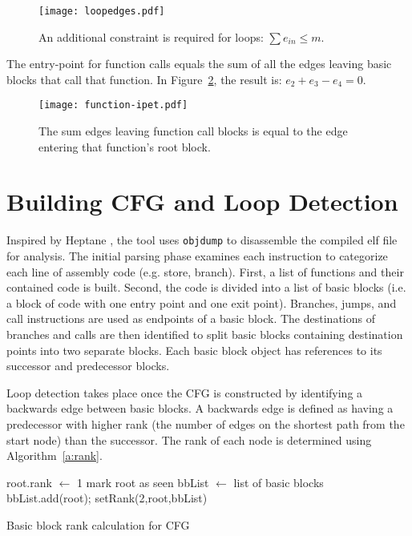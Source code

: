 \begin{figure}[h]
\centering
\texttt{[image: loopedges.pdf]}
\caption[Loop constraints in IPET]{An additional constraint is required for loops: $\sum e_{in} \leq m$.} 
\label{f:loopedges}
\end{figure}


The entry-point for function calls equals the sum of all the edges leaving basic blocks that call that function. In Figure~\ref{f:function-ipet}, the result is: $e_2+e_3-e_4 = 0$. 

\begin{figure}[h]
\centering
\texttt{[image: function-ipet.pdf]}
\caption{The sum edges leaving function call blocks is equal to the edge entering that function's root block.} 
\label{f:function-ipet}
\end{figure}
 

\section{Building CFG and Loop Detection}
\label{s:cfg}
	Inspired by Heptane \cite{heptane}, the tool uses \texttt{objdump} to disassemble the compiled elf file for analysis. 
	The initial parsing phase examines each instruction to categorize each line of assembly code (e.g. store, branch). 
	First, a list of functions and their contained code is built. Second, the code is divided into a list of basic blocks (i.e. a block of code with one entry point and one exit point). 
	Branches, jumps, and call instructions are used as endpoints of a basic block. 
	The destinations of branches and calls are then identified to split basic blocks containing destination points into two separate blocks. 
	Each basic block object has references to its successor and predecessor blocks.

	Loop detection takes place once the CFG is constructed by identifying a backwards edge between basic blocks. 
	A backwards edge is defined as  having a predecessor with higher rank (the number of edges on the shortest path from the start node) than the successor.
	The rank of each node is determined using Algorithm~\ref{a:rank}. 
	
	
\begin{algorithm}


root.rank $\leftarrow$ 1\;
mark root as seen\;
bbList $\leftarrow$ list of basic blocks\;
bbList.add(root);
setRank(2,root,bbList)\;

\caption{Basic block rank calculation for CFG}
\label{a:rank}
\end{algorithm}

